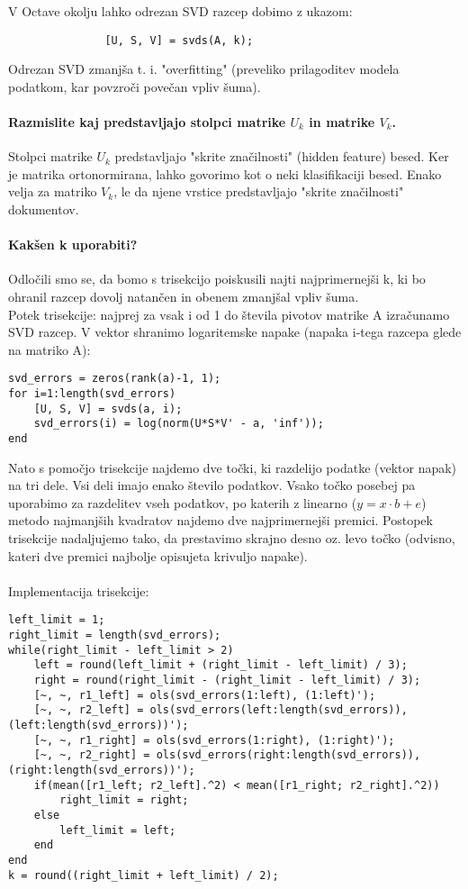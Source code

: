 \documentclass{article}
\begin{document}
V Octave okolju lahko odrezan SVD razcep dobimo z ukazom:

\begin{lstlisting}
               [U, S, V] = svds(A, k);
\end{lstlisting}
Odrezan SVD zmanjša t. i. "overfitting" (preveliko prilagoditev modela podatkom, kar povzroči povečan vpliv šuma).

\paragraph{Razmislite kaj predstavljajo stolpci matrike \( U_{k} \) in matrike \( V_{k} \).}
Stolpci matrike \( U_{k} \) predstavljajo "skrite značilnosti" (hidden feature) besed. Ker je matrika ortonormirana, lahko govorimo kot o neki klasifikaciji besed.
Enako velja za matriko  \( V_{k} \), le da njene vrstice predstavljajo "skrite značilnosti" dokumentov.

\paragraph{Kakšen k uporabiti?}
Odločili smo se, da bomo s trisekcijo poiskusili najti najprimernejši k, ki bo ohranil razcep dovolj natančen in obenem zmanjšal vpliv šuma. 
\pagebreak \\
Potek trisekcije: najprej za vsak i od 1 do števila pivotov matrike A izračunamo SVD razcep. V vektor shranimo logaritemske napake (napaka i-tega razcepa glede na matriko A):

\begin{lstlisting}
svd_errors = zeros(rank(a)-1, 1);
for i=1:length(svd_errors)
	[U, S, V] = svds(a, i);
	svd_errors(i) = log(norm(U*S*V' - a, 'inf'));
end
\end{lstlisting}

Nato s pomočjo trisekcije najdemo dve točki, ki razdelijo podatke (vektor napak) na tri dele. Vsi deli imajo enako število podatkov. Vsako točko posebej pa uporabimo za razdelitev vseh podatkov, po katerih z linearno (\( y = x\cdot b + e \)) metodo najmanjših kvadratov najdemo dve najprimernejši premici. Postopek trisekcije nadaljujemo tako, da prestavimo skrajno desno oz. levo točko (odvisno, kateri dve premici najbolje opisujeta krivuljo napake). \\ \\
Implementacija trisekcije:

\begin{lstlisting}
left_limit = 1;
right_limit = length(svd_errors);
while(right_limit - left_limit > 2)
	left = round(left_limit + (right_limit - left_limit) / 3);
	right = round(right_limit - (right_limit - left_limit) / 3);
	[~, ~, r1_left] = ols(svd_errors(1:left), (1:left)');
	[~, ~, r2_left] = ols(svd_errors(left:length(svd_errors)), (left:length(svd_errors))');
	[~, ~, r1_right] = ols(svd_errors(1:right), (1:right)');
	[~, ~, r2_right] = ols(svd_errors(right:length(svd_errors)), (right:length(svd_errors))');
	if(mean([r1_left; r2_left].^2) < mean([r1_right; r2_right].^2))
		right_limit = right;
	else
		left_limit = left;
	end
end
k = round((right_limit + left_limit) / 2);
\end{lstlisting}
\pagebreak
\end{document}
